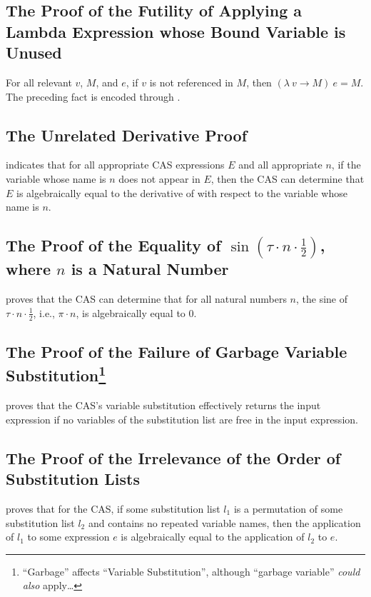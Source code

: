 \documentclass{report}
\begin{document}
\subsection{The Proof of the Futility of Applying a Lambda Expression whose Bound Variable is Unused}
For all relevant \(v\), \(M\), and \(e\), if \(v\) is not referenced in \(M\), then \(\left(\lambda\ v \rightarrow M\right)\ e = M\).  The preceding fact is encoded through .

\subsection{The Unrelated Derivative Proof}
  indicates that for all appropriate  CAS expressions \(E\) and all appropriate \(n\), if the variable whose name is \(n\) does not appear in \(E\), then the  CAS can determine that \(E\) is algebraically equal to the derivative of  with respect to the variable whose name is \(n\).

\subsection{The Proof of the Equality of \(\operatorname{sin} \left(\tau \cdot n \cdot \frac12\right)\), where \(n\) is a Natural Number}
  proves that the  CAS can determine that for all natural numbers \(n\), the sine of \(\tau \cdot n \cdot \frac12\), i.e., \(\pi \cdot n\), is algebraically equal to \(0\).

\subsection{The Proof of the Failure of Garbage Variable Substitution\footnote{``Garbage'' affects ``Variable Substitution'', although ``garbage variable'' \emph{could} \emph{also} apply\ldots\label{fn:garbageVariable}}}
  proves that the  CAS's variable substitution effectively returns the input expression if no variables of the substitution list are free in the input expression.

\subsection{The Proof of the Irrelevance of the Order of Substitution Lists}
  proves that for the  CAS, if some substitution list \(l_1\) is a permutation of some substitution list \(l_2\) and contains no repeated variable names, then the application of \(l_1\) to some expression \(e\) is algebraically equal to the application of \(l_2\) to \(e\).
\end{document}
